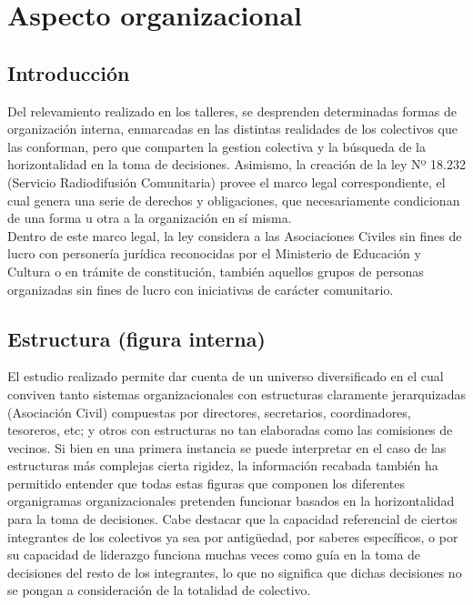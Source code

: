 \chapter{Aspecto organizacional}

\section{Introducci\'on}

Del relevamiento realizado en los talleres, se desprenden determinadas formas de organización interna, enmarcadas en las distintas realidades de los colectivos que las conforman, pero que comparten la gestion colectiva y la búsqueda de la horizontalidad en la toma de decisiones. Asimismo, la creación de la ley Nº 18.232 (Servicio Radiodifusión Comunitaria) provee el marco legal correspondiente, el cual genera una serie de derechos y obligaciones, que necesariamente condicionan de una forma u otra a la organización en sí misma.\\

Dentro de este marco legal, la ley considera a las Asociaciones Civiles sin fines de lucro con personería jurídica reconocidas por el Ministerio de Educación y Cultura o en trámite de constitución, también aquellos grupos de personas organizadas sin fines de lucro con iniciativas de carácter comunitario.\\

\section{Estructura (figura interna)}

\indent El estudio realizado permite dar cuenta de un universo diversificado en el cual conviven tanto sistemas organizacionales con estructuras claramente jerarquizadas (Asociación Civil) compuestas por directores, secretarios, coordinadores, tesoreros, etc; y otros con estructuras no tan elaboradas como las comisiones de vecinos. Si bien en una primera instancia se puede interpretar en el caso de las estructuras más complejas cierta rigidez, la información recabada también ha permitido entender que todas estas figuras que componen los diferentes organigramas organizacionales pretenden funcionar basados en la horizontalidad para la toma de decisiones. Cabe destacar que la capacidad referencial de ciertos integrantes de los colectivos ya sea por antigüedad, por saberes específicos, o por su capacidad de liderazgo funciona muchas veces como guía en la toma de decisiones del resto de los integrantes, lo que no significa que dichas decisiones no se pongan a consideración de la totalidad de colectivo.\\

